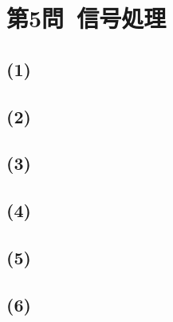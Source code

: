 \documentclass[a4paper,12pt,xelatex,ja=standard]{bxjsarticle}
\begin{document}
\section*{第5問\ 信号処理}
\subsection*{(1)}

\subsection*{(2)}

\subsection*{(3)}

\subsection*{(4)}

\subsection*{(5)}

\subsection*{(6)}
\end{document}
